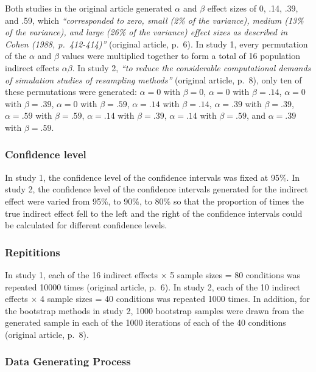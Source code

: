 \documentclass[10,a4paperpaper,]{article}
\begin{document}
Both studies in the original article generated \(\alpha\) and \(\beta\)
effect sizes of 0, .14, .39, and .59, which \emph{``corresponded to
zero, small (2\% of the variance), medium (13\% of the variance), and
large (26\% of the variance) effect sizes as described in Cohen (1988,
p.~412-414)''} (original article, p.~6). In study 1, every permutation
of the \(\alpha\) and \(\beta\) values were multiplied together to form
a total of 16 population indirect effects \(\alpha \beta\). In study 2,
\emph{``to reduce the considerable computational demands of simulation
studies of resampling methods''} (original article, p.~8), only ten of
these permutations were generated: \(\alpha = 0\) with \(\beta = 0\),
\(\alpha = 0\) with \(\beta = .14\), \(\alpha = 0\) with
\(\beta = .39\), \(\alpha = 0\) with \(\beta = .59\), \(\alpha = .14\)
with \(\beta = .14\), \(\alpha = .39\) with \(\beta = .39\),
\(\alpha = .59\) with \(\beta = .59\), \(\alpha = .14\) with
\(\beta = .39\), \(\alpha = .14\) with \(\beta = .59\), and
\(\alpha = .39\) with \(\beta = .59\).

\subsubsection{Confidence level}

In study 1, the confidence level of the confidence intervals was fixed
at 95\%. In study 2, the confidence level of the confidence intervals
generated for the indirect effect were varied from 95\%, to 90\%, to
80\% so that the proportion of times the true indirect effect fell to
the left and the right of the confidence intervals could be calculated
for different confidence levels.

\subsubsection{Repititions}

In study 1, each of the 16 indirect effects \(\times\) 5 sample sizes =
80 conditions was repeated 10000 times (original article, p.~6). In
study 2, each of the 10 indirect effects \(\times\) 4 sample sizes = 40
conditions was repeated 1000 times. In addition, for the bootstrap
methods in study 2, 1000 bootstrap samples were drawn from the generated
sample in each of the 1000 iterations of each of the 40 conditions
(original article, p.~8).

\subsubsection{Data Generating Process}
\end{document}
